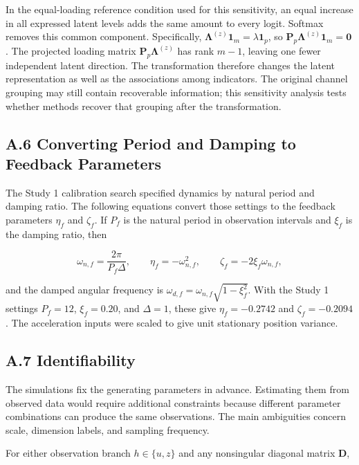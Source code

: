 \documentclass[
]{article}
\begin{document}
In the equal-loading reference condition used for this sensitivity, an
equal increase in all expressed latent levels adds the same amount to
every logit. Softmax removes this common component. Specifically,
\(\boldsymbol\Lambda^{(z)}\mathbf 1_m=\lambda\mathbf 1_p\), so
\(\mathbf P_p\boldsymbol\Lambda^{(z)}\mathbf 1_m=\mathbf 0\). The
projected loading matrix \(\mathbf P_p\boldsymbol\Lambda^{(z)}\) has
rank \(m-1\), leaving one fewer independent latent direction. The
transformation therefore changes the latent representation as well as
the associations among indicators. The original channel grouping may
still contain recoverable information; this sensitivity analysis tests
whether methods recover that grouping after the transformation.

\subsection{A.6 Converting Period and Damping to Feedback
Parameters}\label{a.6-converting-period-and-damping-to-feedback-parameters}

The Study 1 calibration search specified dynamics by natural period and
damping ratio. The following equations convert those settings to the
feedback parameters \(\eta_f\) and \(\zeta_f\). If \(P_f\) is the
natural period in observation intervals and \(\xi_f\) is the damping
ratio, then

\[
\omega_{n,f}=\frac{2\pi}{P_f\Delta},
\qquad
\eta_f=-\omega_{n,f}^2,
\qquad
\zeta_f=-2\xi_f\omega_{n,f},
\]

and the damped angular frequency is
\(\omega_{d,f}=\omega_{n,f}\sqrt{1-\xi_f^2}\). With the Study 1 settings
\(P_f=12\), \(\xi_f=0.20\), and \(\Delta=1\), these give
\(\eta_f=-0.2742\) and \(\zeta_f=-0.2094\). The acceleration inputs were
scaled to give unit stationary position variance.

\subsection{A.7 Identifiability}\label{a.7-identifiability}

The simulations fix the generating parameters in advance. Estimating
them from observed data would require additional constraints because
different parameter combinations can produce the same observations. The
main ambiguities concern scale, dimension labels, and sampling
frequency.

For either observation branch \(h\in\{u,z\}\) and any nonsingular
diagonal matrix \(\mathbf{D}\),
\end{document}
